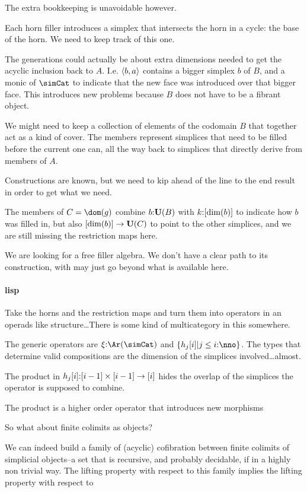 \documentclass[csh.tex]{subfiles}
\begin{document}
The extra bookkeeping is unavoidable however.

Each horn filler introduces a simplex that intersects the horn in a cycle: the base of the horn. We need to keep track of this one.

The generations could actually be about extra dimensions needed to get the acyclic inclusion back to $A$. I.e. $\left\langle b,a \right\rangle$ contains a bigger simplex $b$ of $B$, and a monic of $\simCat$ to indicate that the new face was introduced over that bigger face. This introduces new problems because $B$ does not have to be a fibrant object.

We might need to keep a collection of elements of the codomain $B$ that together act as a kind of cover. The members represent simplices that need to be filled before the current one can, all the way back to simplices that directly derive from members of $A$.     

Constructions are known, but we need to kip ahead of the line to the end result in order to get what we need. 

The members of $C=\dom(g)$ combine $b\mathord : \mathbf{U}(B)$ with $k\mathord :[\dim(b)]$ to indicate how $b$ was filled in,
but also $[\dim(b)]\to \mathbf{U}(C)$ to point to the other simplices, and we are still missing the restriction maps here.

We are looking for a free filler algebra. We don't have a clear path to its construction, with may just go beyond what is available here.

\paragraph{lisp}
Take the horns and the restriction maps and turn them into operators in an operads like structure\dots There is some kind of multicategory in this somewhere. 

The generic operators are $\xi\of\Ar(\simCat)$ and $\set{ h_j[i] | j\leq i\of\nno }$. The types that determine valid compositions are the dimension of the simplices involved\dots almost.

The product in $h_j[i]\mathord : [i-1]\times[i-1]\to [i]$ hides the overlap of the simplices the operator is supposed to combine.

The product is a higher order operator that introduces new morphisms 

So what about finite colimits as objects?

We can indeed build a family of (acyclic) cofibration between finite colimits of simplicial objects--a set that is recursive, and probably decidable, if in a highly non trivial way. The lifting property with respect to this family implies the lifting property with respect to 
\end{document}
